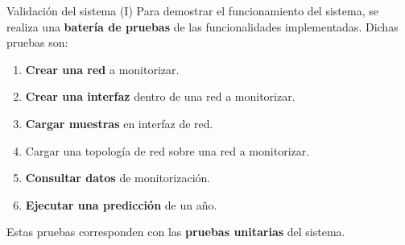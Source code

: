 \documentclass[aspectratio=169,xcolor=dvipsnames]{beamer}
\begin{document}
	\begin{frame}{Validación del sistema (I)}
		Para demostrar el funcionamiento del sistema, se realiza una \textbf{batería de pruebas} de las funcionalidades implementadas. Dichas pruebas son:
		
		\begin{enumerate}
			\item \textbf{Crear una red} a monitorizar.
			
			\item \textbf{Crear una interfaz} dentro de una red a monitorizar.
			
			\item \textbf{Cargar muestras} en interfaz de red.
			
			\item Cargar una topología de red sobre una red a monitorizar.
			
			\item \textbf{Consultar datos} de monitorización.
			
			\item \textbf{Ejecutar una predicción} de un año.
		\end{enumerate}
	
	\vspace{12px}
	
	Estas pruebas corresponden con las \textbf{pruebas unitarias} del sistema.
		
	\end{frame}
\end{document}
